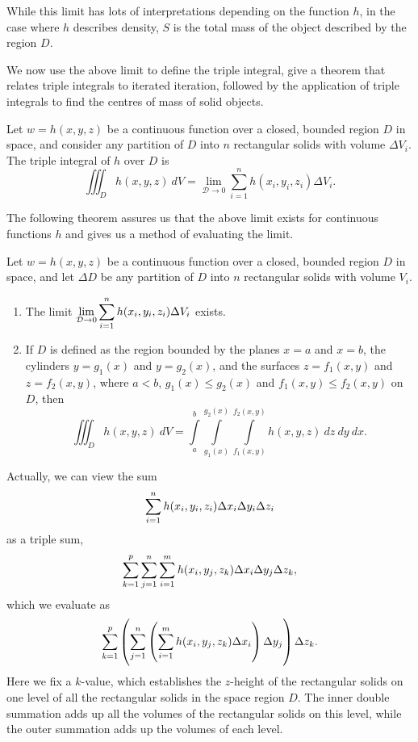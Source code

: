 While this limit has lots of interpretations depending on the function $h$, in the case where $h$ describes density, $S$ is the total mass of the object described by the region $D$.

We now use the above limit to define the triple integral, give a theorem that relates triple integrals to iterated iteration, followed by the application of triple integrals to find the centres of mass of solid objects.


\begin{definition}
\label{def:triple_integral_3}
Let $w=h(x,y,z)$ be a continuous function over a closed, bounded region $D$ in space, and consider any partition of $D$ into $n$ rectangular solids with volume $\Delta V_i$. The triple integral of $h$ over $D$ is
$$\iiint_Dh(x,y,z)\ dV = \lim_{\mathcal{D}\to 0}\sum_{i=1}^n h(x_i,y_i,z_i)\Delta V_i.$$
\end{definition}


The following theorem assures us that the above limit exists for continuous functions $h$ and gives us a method of evaluating the limit.

\begin{theorem}
\label{thm:triple_integration2}
Let $w=h(x,y,z)$ be a continuous function over a closed, bounded region $D$ in space, and let $\Delta D$ be any partition of $D$ into $n$ rectangular solids with volume $V_i$.

\begin{enumerate}
\item		The limit $\displaystyle \lim_{\mathcal{D}\to 0}\sum_{i=1}^n h(x_i,y_i,z_i)\Delta V_i$ exists.

\item		If $D$ is defined as the region bounded by the planes $x=a$ and $x=b$, the cylinders $y=g_1(x)$ and $y=g_2(x)$, and the surfaces $z=f_1(x,y)$ and $z=f_2(x,y)$, where $a<b$, $g_1(x)\leq g_2(x)$ and $f_1(x,y)\leq f_2(x,y)$ on $D$, then
	$$\iiint_D h(x,y,z)\ dV = \int\limits_a^b\int\limits_{g_1(x)}^{g_2(x)}\int\limits_{f_1(x,y)}^{f_2(x,y)} h(x,y,z)\ dz\ dy\ dx.$$

\end{enumerate}
\end{theorem}


Actually, we can view the sum $$\displaystyle \sum_{i=1}^nh(x_i,y_i,z_i)\Delta x_i\Delta y_i\Delta z_i$$ as a triple sum, $$\sum_{k=1}^p\sum_{j=1}^n\sum_{i=1}^mh(x_i,y_j,z_k)\Delta x_i\Delta y_j\Delta z_k,$$ which we evaluate as
$$\sum_{k=1}^p\left(\sum_{j=1}^n\left(\sum_{i=1}^mh(x_i,y_j,z_k)\Delta x_i\right)\Delta y_j\right)\Delta z_k.$$
Here we fix a $k$-value, which establishes the $z$-height of the rectangular solids on one level of all the rectangular solids in the space region $D$. The inner double summation adds up all the volumes of the rectangular solids on this level, while the outer summation adds up the volumes of each level.

